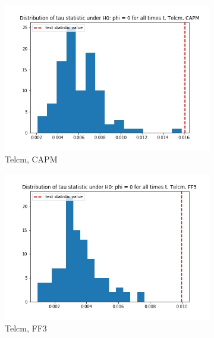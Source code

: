 \documentclass{article}
\begin{document}
  \begin{figure}
  \centering
  \begin{subfigure}[b]{0.3\textwidth}
    \centering
    \includegraphics[width=\textwidth]{Telcm/tau_hist_02_CAPM.jpg}
    \caption{Telcm, CAPM}
    \label{fig:1}
  \end{subfigure}
  \begin{subfigure}[b]{0.3\textwidth}
    \centering
    \includegraphics[width=\textwidth]{Telcm/tau_hist_02_FF3.jpg}
    \caption{Telcm, FF3}
    \label{fig:2}
  \end{subfigure}
    \begin{subfigure}[b]{0.3\textwidth}
    \centering

\end{subfigure}
\end{figure}
\end{document}
